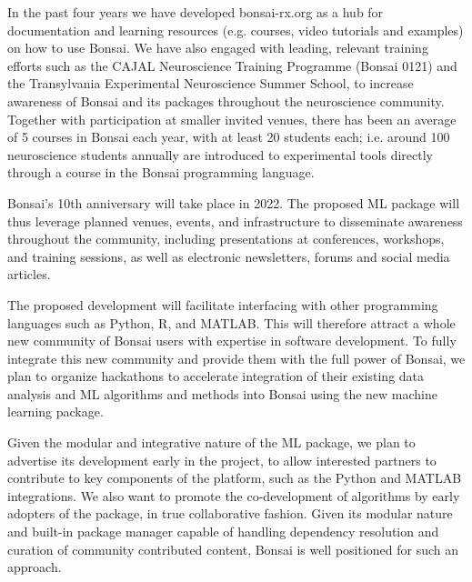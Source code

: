In the past four years we have developed bonsai-rx.org as a hub for documentation and learning
resources (e.g. courses, video tutorials and examples) on how to use Bonsai. We have also engaged
with leading, relevant training efforts such as the CAJAL Neuroscience
Training Programme (Bonsai 0121) and the Transylvania Experimental Neuroscience
Summer School, to increase awareness of Bonsai and
its packages throughout the neuroscience community. Together with participation
at smaller invited venues, there has been an average of 5 courses in Bonsai
each year, with at least 20 students each; i.e.  around 100 neuroscience students annually are introduced to experimental tools directly through a
course in the Bonsai programming language.

Bonsai's 10th anniversary will take place in 2022. The proposed ML package will thus leverage planned venues, events, and infrastructure to disseminate
awareness throughout the community, including presentations at conferences,
workshops, and training sessions, as well as electronic newsletters, forums and
social media articles.

The proposed development will facilitate interfacing with other programming languages
such as Python, R, and MATLAB. This will therefore attract a whole new
community of Bonsai users with expertise in software development. To fully integrate this new community and provide them with the full power of Bonsai,
we plan to organize hackathons to accelerate integration of their existing data
analysis and ML algorithms and methods into Bonsai using the new
machine learning package.

 Given the modular and integrative nature of the ML package, we
 plan to advertise its development early in the project, to allow interested
 partners to contribute to key
 components of the platform, such as the Python and MATLAB integrations. We
 also want to promote the co-development of algorithms by early adopters of the
 package, in true collaborative fashion. Given its modular nature and built-in
 package manager capable of handling dependency resolution and curation of
 community contributed content, Bonsai is well positioned for such an approach.
